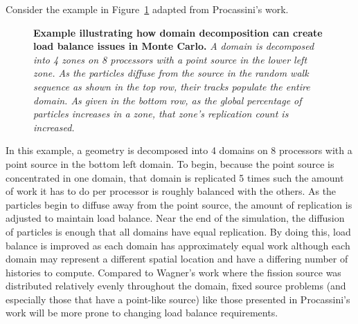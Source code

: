 Consider the example in Figure~\ref{fig:procassini_example} adapted
from Procassini's work.
\begin{figure}[htpb!]
  \begin{center}
    \scalebox{1.5}{
       }
  \end{center}
  \caption{\textbf{Example illustrating how domain decomposition can
      create load balance issues in Monte Carlo.}  \textit{A domain is
      decomposed into 4 zones on 8 processors with a point source in
      the lower left zone. As the particles diffuse from the source in
      the random walk sequence as shown in the top row, their tracks
      populate the entire domain. As given in the bottom row, as the
      global percentage of particles increases in a zone, that zone's
      replication count is increased.}}
  \label{fig:procassini_example}
\end{figure}
In this example, a geometry is decomposed into 4 domains on 8
processors with a point source in the bottom left domain. To begin,
because the point source is concentrated in one domain, that domain is
replicated 5 times such the amount of work it has to do per processor
is roughly balanced with the others. As the particles begin to diffuse
away from the point source, the amount of replication is adjusted to
maintain load balance. Near the end of the simulation, the diffusion
of particles is enough that all domains have equal replication.  By
doing this, load balance is improved as each domain has approximately
equal work although each domain may represent a different spatial
location and have a differing number of histories to
compute. Compared to Wagner's work where the fission source was
distributed relatively evenly throughout the domain, fixed source
problems (and especially those that have a point-like source) like
those presented in Procassini's work will be more prone to changing
load balance requirements.

